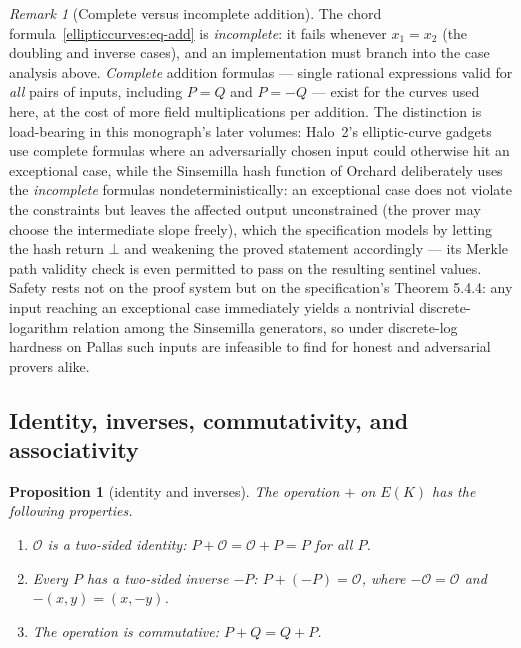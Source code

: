 \documentclass[11pt,a4paper]{article}
\newtheorem{proposition}[theorem]{Proposition}
\theoremstyle{definition}
\theoremstyle{remark}
\newtheorem{remark}[theorem]{Remark}
\begin{document}
\begin{remark}[Complete versus incomplete addition]\label{ellipticcurves:rem-complete}
The chord formula~\eqref{ellipticcurves:eq-add} is \emph{incomplete}: it fails whenever \(x_1 = x_2\) (the doubling and inverse cases), and an implementation must branch into the case analysis above. \emph{Complete} addition formulas --- single rational expressions valid for \emph{all} pairs of inputs, including \(P = Q\) and \(P = -Q\) --- exist for the curves used here, at the cost of more field multiplications per addition. The distinction is load-bearing in this monograph's later volumes: Halo~2's elliptic-curve gadgets use complete formulas where an adversarially chosen input could otherwise hit an exceptional case, while the Sinsemilla hash function of Orchard deliberately uses the \emph{incomplete} formulas nondeterministically: an exceptional case does not violate the constraints but leaves the affected output unconstrained (the prover may choose the intermediate slope freely), which the specification models by letting the hash return \(\bot\) and weakening the proved statement accordingly --- its Merkle path validity check is even permitted to pass on the resulting sentinel values. Safety rests not on the proof system but on the specification's Theorem 5.4.4: any input reaching an exceptional case immediately yields a nontrivial discrete-logarithm relation among the Sinsemilla generators, so under discrete-log hardness on Pallas such inputs are infeasible to find for honest and adversarial provers alike.
\end{remark}
\subsection{Identity, inverses, commutativity, and associativity}

\begin{proposition}[identity and inverses]\label{ellipticcurves:prop-id-inv}
The operation \(+\) on \(E(K)\) has the following properties.
\begin{enumerate}
  \item \(\mathcal{O}\) is a two-sided identity: \(P + \mathcal{O} = \mathcal{O} + P = P\) for all \(P\).
  \item Every \(P\) has a two-sided inverse \(-P\): \(P + (-P) = \mathcal{O}\), where \(-\mathcal{O} = \mathcal{O}\) and \(-(x,y) = (x,-y)\).
  \item The operation is commutative: \(P + Q = Q + P\).
\end{enumerate}
\end{proposition}
\end{document}
